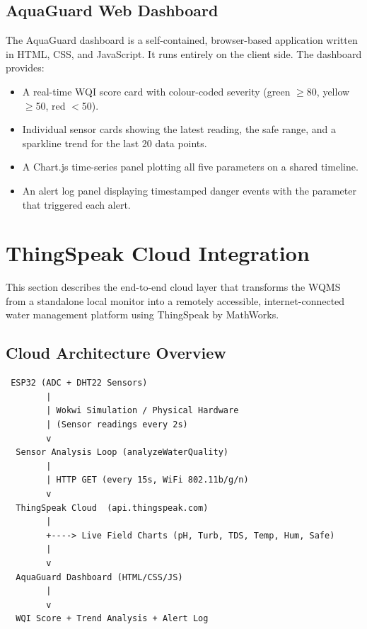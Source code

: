\documentclass[12pt,a4paper]{article}
\begin{document}
\subsection{AquaGuard Web Dashboard}

The AquaGuard dashboard is a self-contained, browser-based
application written in HTML, CSS, and JavaScript. It runs
entirely on the client side. The dashboard provides:
\begin{itemize}[leftmargin=2em, itemsep=3pt]
  \item A real-time WQI score card with colour-coded severity
        (green $\geq$80, yellow $\geq$50, red $<$50).
  \item Individual sensor cards showing the latest reading,
        the safe range, and a sparkline trend for the last 20
        data points.
  \item A Chart.js time-series panel plotting all five parameters
        on a shared timeline.
  \item An alert log panel displaying timestamped danger events
        with the parameter that triggered each alert.
\end{itemize}

\section{ThingSpeak Cloud Integration}
\label{sec:cloud}

 This section describes the end-to-end cloud
layer that transforms the WQMS from a standalone local monitor
into a remotely accessible, internet-connected water management
platform using ThingSpeak by MathWorks.


\subsection{Cloud Architecture Overview}

\begin{center}
\begin{mdframed}[style=cloudbox]
\begin{verbatim}
 ESP32 (ADC + DHT22 Sensors)
        |
        | Wokwi Simulation / Physical Hardware
        | (Sensor readings every 2s)
        v
  Sensor Analysis Loop (analyzeWaterQuality)
        |
        | HTTP GET (every 15s, WiFi 802.11b/g/n)
        v
  ThingSpeak Cloud  (api.thingspeak.com)
        |
        +----> Live Field Charts (pH, Turb, TDS, Temp, Hum, Safe)
        |
        v
  AquaGuard Dashboard (HTML/CSS/JS)
        |
        v
  WQI Score + Trend Analysis + Alert Log
\end{verbatim}
\end{mdframed}
\end{center}
\end{document}
